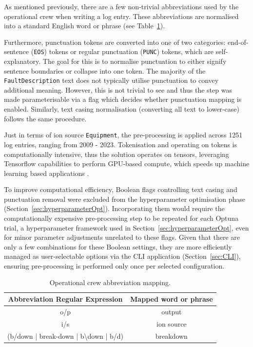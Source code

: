 \documentclass[10pt,oneside]{report}
\begin{document}
As mentioned previously, there are a few non-trivial abbreviations used by the operational crew when writing a log entry. These abbreviations are normalised into a standard English word or phrase (see Table~\ref{tab:abbrevCrew}).

Furthermore, punctuation tokens are converted into one of two categories: end-of-sentence (\texttt{EOS}) tokens or regular punctuation (\texttt{PUNC}) tokens, which are self-explanatory. The goal for this is to normalise punctuation to either signify sentence boundaries or collapse into one token. The majority of the \texttt{FaultDescription} text does not typically utilise punctuation to convey additional meaning. However, this is not trivial to see and thus the step was made parameterisable via a flag which decides whether punctuation mapping is enabled. Similarly, text casing normalisation (converting all text to lower-case) follows the same procedure. 

Just in terms of ion source \texttt{Equipment}, the pre-processing is applied across 1251 log entries, ranging from 2009 - 2023. Tokenisation and operating on tokens is computationally intensive, thus the solution operates on tensors, leveraging Tensorflow capabilities to perform GPU-based compute, which speeds up machine learning based applications \cite{tensorflow2015whitepaper, baldini2014predicting}.

To improve computational efficiency, Boolean flags controlling text casing and punctuation removal were excluded from the hyperparameter optimisation phase (Section~\ref{sec:hyperparameterOpt}). Incorporating them would require the computationally expensive pre-processing step to be repeated for each Optuna \cite{akiba2019optuna} trial, a hyperparameter framework used in Section~\ref{sec:hyperparameterOpt}, even for minor parameter adjustments unrelated to these flags. Given that there are only a few combinations for these Boolean settings, they are more efficiently managed as user-selectable options via the CLI application (Section~\ref{sec:CLI}), ensuring pre-processing is performed only once per selected configuration.

\begin{table}[htbp]
    \fontsize{8}{12}\selectfont
    \centering
    \begin{adjustbox}{max width=\textwidth}
    \begin{tabular}{c | c}
        \toprule
        \textbf{Abbreviation Regular Expression} & \textbf{Mapped word or phrase} \\
        \midrule
        {o/p} & {output} \\
        {i/s} & {ion source} \\
        {(b/down | break-down | b\textbackslash down | b/d)} & {breakdown} \\
        \bottomrule
    \end{tabular}
    \end{adjustbox}
    \caption{Operational crew abbreviation mapping.}
    \label{tab:abbrevCrew}
\end{table}
\end{document}
